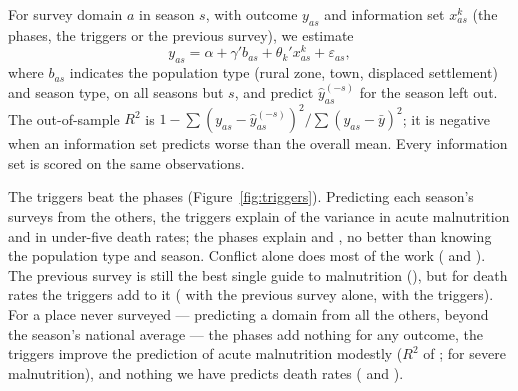 \documentclass[11pt]{article}
\begin{document}
For survey domain $a$ in season $s$, with outcome $y_{as}$ and information set $x^k_{as}$ (the phases, the triggers or the previous survey), we estimate
\begin{equation}\label{eq:predict}
y_{as} = \alpha + \gamma' b_{as} + \theta_k' x^k_{as} + \varepsilon_{as},
\end{equation}
where $b_{as}$ indicates the population type (rural zone, town, displaced settlement) and season type, on all seasons but $s$, and predict $\hat y^{(-s)}_{as}$ for the season left out. The out-of-sample $R^2$ is $1 - \sum (y_{as} - \hat y^{(-s)}_{as})^2 / \sum (y_{as} - \bar y)^2$; it is negative when an information set predicts worse than the overall mean. Every information set is scored on the same observations.

The triggers beat the phases (Figure~\ref{fig:triggers}). Predicting each season's surveys from the others, the triggers explain \trGamTrig{} of the variance in acute malnutrition and \trUfiveTrig{} in under-five death rates; the phases explain \trGamPhase{} and \trUfivePhase{}, no better than knowing the population type and season. Conflict alone does most of the work (\trSingleConfGam{} and \trSingleConfUfive{}). The previous survey is still the best single guide to malnutrition (\trGamLast{}), but for death rates the triggers add to it (\trUfiveLast{} with the previous survey alone, \trUfiveLastTrig{} with the triggers). For a place never surveyed --- predicting a domain from all the others, beyond the season's national average --- the phases add nothing for any outcome, the triggers improve the prediction of acute malnutrition modestly ($R^2$ of \ldGamTrig{}; \ldSamTrig{} for severe malnutrition), and nothing we have predicts death rates (\ldCdrTrig{} and \ldUfiveTrig{}).
\end{document}
